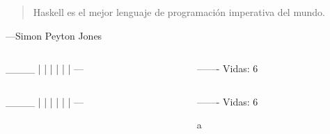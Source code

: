 \documentclass[spanish]{beamer}
\begin{document}

\begin{frame}
  \begin{quote}
    Haskell es el mejor lenguaje de programación imperativa del mundo.
  \end{quote}
  \hfill---Simon Peyton Jones
\end{frame}


\begin{frame}[fragile]
  \begin{columns}[onlytextwidth,T]
    \begin{column}{.5\textwidth}
        \begin{code}
  ____
  |  |
  |
  |
  |
  |
 ---
        \end{code}
    \end{column}
    \begin{column}{.5\textwidth}
      \begin{code}


 -------          Vidas: 6




      \end{code}
    \end{column}
  \end{columns}
\end{frame}


\begin{frame}[fragile]
  \begin{columns}[onlytextwidth,T]
    \begin{column}{.5\textwidth}
        \begin{code}
  ____
  |  |
  |
  |
  |
  |
 ---
        \end{code}
    \end{column}
    \begin{column}{.5\textwidth}
      \begin{code}


 -------          Vidas: 6

 a


      \end{code}
    \end{column}
  \end{columns}
\end{frame}
\end{document}
